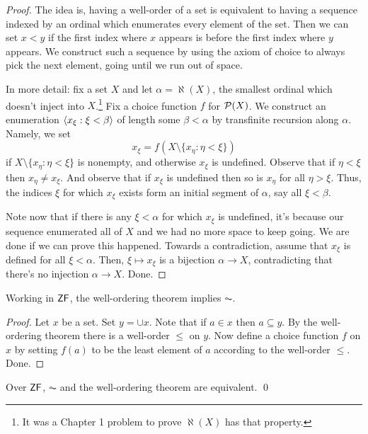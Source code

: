 \documentclass[10pt]{amsart}
\begin{document}
\begin{proof}
The idea is, having a well-order of a set is equivalent to having a sequence indexed by an ordinal which enumerates every element of the set. Then we can set $x < y$ if the first index where $x$ appears is before the first index where $y$ appears. We construct such a sequence by using the axiom of choice to always pick the next element, going until we run out of space.

In more detail: fix a set $X$ and let $\alpha = \aleph(X)$, the smallest ordinal which doesn't inject into $X$.\footnote{It was a Chapter 1 problem to prove $\aleph(X)$ has that property.} Fix a choice function $f$ for $\mathcal{P}(X)$. We construct an enumeration ${\left\langle x_\xi : \xi < \beta \right\rangle}$ of length some $\beta < \alpha$ by transfinite recursion along $\alpha$. Namely, we set
\[
x_\xi = f(X \setminus \{ x_\eta : \eta < \xi \})
\]
if $X \setminus \{ x_\eta : \eta < \xi \}$ is nonempty, and otherwise $x_\xi$ is undefined. Observe that if $\eta < \xi$ then $x_\eta \ne x_\xi$. And observe that if $x_\xi$ is undefined then so is $x_\eta$ for all $\eta > \xi$. Thus, the indices $\xi$ for which $x_\xi$ exists form an initial segment of $\alpha$, say all $\xi < \beta$. 

Note now that if there is any $\xi < \alpha$ for which $x_\xi$ is undefined, it's because our sequence enumerated all of $X$ and we had no more space to keep going. We are done if we can prove this happened. Towards a contradiction, assume that $x_\xi$ is defined for all $\xi < \alpha$. Then, $\xi \mapsto x_\xi$ is a bijection $\alpha \to X$, contradicting that there's no injection $\alpha \to X$. Done.
\end{proof}

\begin{theorem}
Working in $\mathsf{ZF}$, the well-ordering theorem implies $\AC$.
\end{theorem}

\begin{proof}
Let $x$ be a set. Set $y = \cup x$. Note that if $a \in x$ then $a \subseteq y$. By the well-ordering theorem there is a well-order $\le$ on $y$. Now define a choice function $f$ on $x$ by setting $f(a)$ to be the least element of $a$ according to the well-order $\le$. Done.
\end{proof}

\begin{corollary}
Over $\mathsf{ZF}$, $\AC$ and the well-ordering theorem are equivalent. \qed
\end{corollary}
\end{document}
